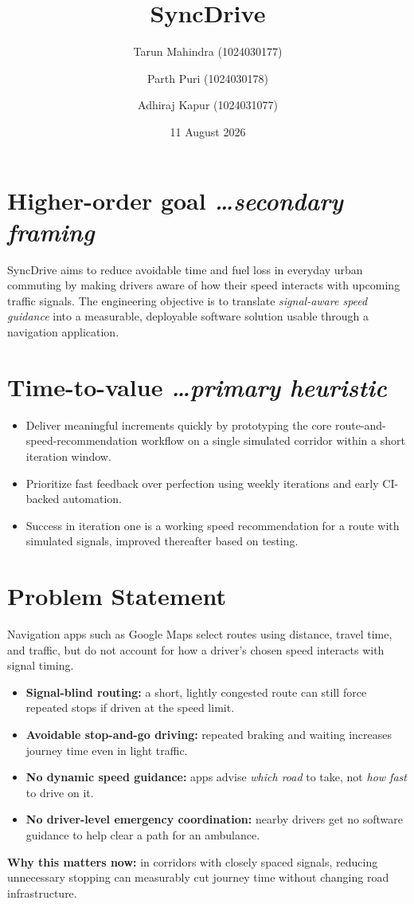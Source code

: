 \documentclass[11pt,a4paper]{article}
\title{SyncDrive}
\author{
  Tarun Mahindra (1024030177)
  \and 
  Parth Puri (1024030178)
  \and
  Adhiraj Kapur (1024031077)
}
\date{11 August 2026}
\newcommand{\BvrHint}[1]{%
  {\normalfont\normalsize\itshape\hfill #1}}
\begin{document}
\maketitle

\section{Higher-order goal%
  \BvrHint{\ldots secondary framing}}
SyncDrive aims to reduce avoidable time and fuel loss in
everyday urban commuting by making drivers aware of how
their speed interacts with upcoming traffic signals. The
engineering objective is to translate \emph{signal-aware
  speed guidance} into a measurable, deployable software
solution usable through a navigation application.

\section{Time-to-value %
\BvrHint{\ldots primary heuristic}}
\begin{itemize}[leftmargin=0.7cm]
    \item Deliver meaningful increments quickly by prototyping the core route-and-speed-recommendation workflow on a single simulated corridor within a short iteration window.
    \item Prioritize fast feedback over perfection using weekly iterations and early CI-backed automation.
    \item Success in iteration one is a working speed recommendation for a route with simulated signals, improved thereafter based on testing.
\end{itemize}

\section{Problem Statement}
Navigation apps such as Google Maps select routes using
distance, travel time, and traffic, but do not account for
how a driver's chosen speed interacts with signal timing.
\begin{itemize}[leftmargin=0.7cm]
    \item \textbf{Signal-blind routing:} a short, lightly congested route can still force repeated stops if driven at the speed limit.
    \item \textbf{Avoidable stop-and-go driving:} repeated braking and waiting increases journey time even in light traffic.
    \item \textbf{No dynamic speed guidance:} apps advise \emph{which road} to take, not \emph{how fast} to drive on it.
    \item \textbf{No driver-level emergency coordination:} nearby drivers get no software guidance to help clear a path for an ambulance.
\end{itemize}
\textbf{Why this matters now:} in corridors with closely spaced signals, reducing unnecessary stopping can measurably cut journey time without changing road infrastructure.
\end{document}

